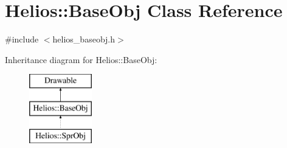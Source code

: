 \hypertarget{class_helios_1_1_base_obj}{}\section{Helios\+:\+:Base\+Obj Class Reference}
\label{class_helios_1_1_base_obj}


{\ttfamily \#include $<$helios\+\_\+baseobj.\+h$>$}

Inheritance diagram for Helios\+:\+:Base\+Obj\+:\begin{figure}[H]
\begin{center}
\leavevmode
\includegraphics[height=3.000000cm]{class_helios_1_1_base_obj}
\end{center}
\end{figure}
